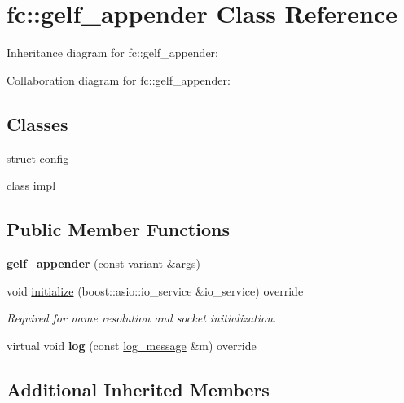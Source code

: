 \hypertarget{classfc_1_1gelf__appender}{}\section{fc\+:\+:gelf\+\_\+appender Class Reference}
\label{classfc_1_1gelf__appender}


Inheritance diagram for fc\+:\+:gelf\+\_\+appender\+:


Collaboration diagram for fc\+:\+:gelf\+\_\+appender\+:
\subsection*{Classes}
\begin{DoxyCompactItemize}
\item 
struct \mbox{\hyperlink{structfc_1_1gelf__appender_1_1config}{config}}
\item 
class \mbox{\hyperlink{classfc_1_1gelf__appender_1_1impl}{impl}}
\end{DoxyCompactItemize}
\subsection*{Public Member Functions}
\begin{DoxyCompactItemize}
\item 
\mbox{\label{classfc_1_1gelf__appender_a604a1c78a72120d9a25a2b26ef3234b1}} 
{\bfseries gelf\+\_\+appender} (const \mbox{\hyperlink{classfc_1_1variant}{variant}} \&args)
\item 
void \mbox{\hyperlink{classfc_1_1gelf__appender_ab6509d82a033f86a7066849841465ff0}{initialize}} (boost\+::asio\+::io\+\_\+service \&io\+\_\+service) override
\begin{DoxyCompactList}\small\item\em Required for name resolution and socket initialization. \end{DoxyCompactList}\item 
\mbox{\label{classfc_1_1gelf__appender_a2f41c751b1f98f809b5305df6d6a6ffc}} 
virtual void {\bfseries log} (const \mbox{\hyperlink{classfc_1_1log__message}{log\+\_\+message}} \&m) override
\end{DoxyCompactItemize}
\subsection*{Additional Inherited Members}


